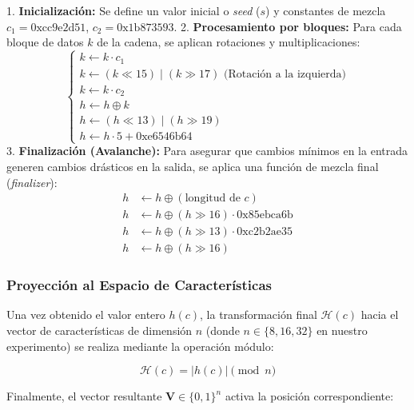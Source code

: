 \documentclass[a4paper,10pt]{book}
\begin{document}
		1. \textbf{Inicialización:} Se define un valor inicial o \textit{seed} ($s$) y constantes de mezcla $c_1 = \text{0xcc9e2d51}$, $c_2 = \text{0x1b873593}$.
		2. \textbf{Procesamiento por bloques:} Para cada bloque de datos $k$ de la cadena, se aplican rotaciones y multiplicaciones:
		\begin{equation}
			\begin{cases}
				k \leftarrow k \cdot c_1 \\
				k \leftarrow (k \ll 15) \mid (k \gg 17) \text{ (Rotación a la izquierda)} \\
				k \leftarrow k \cdot c_2 \\
				h \leftarrow h \oplus k \\
				h \leftarrow (h \ll 13) \mid (h \gg 19) \\
				h \leftarrow h \cdot 5 + \text{0xe6546b64}
			\end{cases}
		\end{equation}
		3. \textbf{Finalización (Avalanche):} Para asegurar que cambios mínimos en la entrada generen cambios drásticos en la salida, se aplica una función de mezcla final (\textit{finalizer}):
		\begin{equation}
			\begin{aligned}
				h &\leftarrow h \oplus (\text{longitud de } c) \\
				h &\leftarrow h \oplus (h \gg 16) \cdot \text{0x85ebca6b} \\
				h &\leftarrow h \oplus (h \gg 13) \cdot \text{0xc2b2ae35} \\
				h &\leftarrow h \oplus (h \gg 16)
			\end{aligned}
		\end{equation}
		
		
		
		\subsubsection{Proyección al Espacio de Características}
		
		Una vez obtenido el valor entero $h(c)$, la transformación final $\mathcal{H}(c)$ hacia el vector de características de dimensión $n$ (donde $n \in \{8, 16, 32\}$ en nuestro experimento) se realiza mediante la operación módulo:
		
		\begin{equation}
			\mathcal{H}(c) = |h(c)| \pmod n
		\end{equation}
		
		Finalmente, el vector resultante $\mathbf{V} \in \{0, 1\}^n$ activa la posición correspondiente:
		
\end{document}
